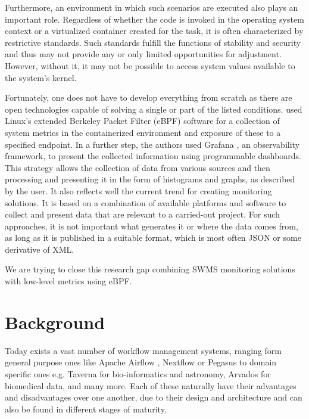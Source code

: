\documentclass[a4paper,journal]{IEEEtran}
\begin{document}
Furthermore, an environment in which such scenarios are executed also plays an important role. Regardless of whether the code is invoked in the operating system context or a virtualized container created for the task, it is often characterized by restrictive standards. Such standards fulfill the functions of stability and security and thus may not provide any or only limited opportunities for adjustment. However, without it, it may not be possible to access system values available to the system's kernel. 

Fortunately, one does not have to develop everything from scratch as there are open technologies capable of solving a single or part of the listed conditions. \citeauthor{levin2020viperproberethinkingmicroservice} used Linux’s extended Berkeley Packet Filter (eBPF) \cite{ebpf} software for a collection of system metrics in the containerized environment and exposure of these to a specified endpoint. In a further step, the authors used Grafana \cite{grafana}, an observability framework, to present the collected information using programmable dashboards. This strategy allows the collection of data from various sources and then processing and presenting it in the form of histograms and graphs, as described by the user. It also reflects well the current trend for creating monitoring solutions. It is based on a combination of available platforms and software to collect and present data that are relevant to a carried-out project. For such approaches, it is not important what generates it or where the data comes from, as long as it is published in a suitable format, which is most often JSON or some derivative of XML. 

We are trying to close this research gap combining SWMS monitoring solutions with low-level metrics using eBPF.


\section{Background}
\label{sec:background}
Today exists a vast number of workflow management systems, ranging form general purpose ones like Apache Airflow \cite{airflow}, Nextflow \cite{nextflow} or Pegasus \cite{pegasus} to domain specific ones e.g. Taverna \cite{taverna} for bio-informatics and astronomy, Arvados \cite{arvados} for biomedical data, and many more. Each of these naturally have their advantages and disadvantages over one another, due to their design and architecture and can also be found in different stages of maturity.
\end{document}
